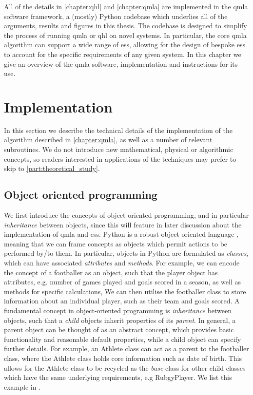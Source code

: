 All of the details in \cref{chapter:qhl} and \cref{chapter:qmla} are implemented in the \gls{qmla}
    software framework, a (mostly) Python codebase which underlies all of the 
    arguments, results and figures in this thesis. 
The codebase is designed to simplify the process of running \gls{qmla} or \gls{qhl}
    on novel systems.
In particular, the core \gls{qmla} algorithm can support a wide range of \glspl{es}, 
    allowing for the design of bespoke \glspl{es} to account for the specific requirements 
    of any given system. 
In this chapter we give an overview of the \gls{qmla} software, 
    implementation and instructions for its use. 

\section{Implementation}
In this section we describe the technical details of the implementation of the 
    algorithm described in \cref{chapter:qmla}, as well as a number of relevant subroutines. 
We do not introduce new mathematical, physical or algorithmic concepts, 
    so readers interested in applications of the techniques may prefer to skip to \cref{part:theoretical_study}.

\subsection{Object oriented programming}
We first introduce the concepts of object-oriented programming, 
    and in particular \emph{inheritance} between objects, 
    since this will feature in later discussion about the implementation of \gls{qmla}
    and \glspl{es}. 
Python is a robust object-oriented language \cite{python-manual}, meaning that we can frame 
    concepts as objects which permit actions to be performed by/to them. 
In particular, objects in Python are formulated as \emph{classes}, 
    which can have associated \emph{attributes} and \emph{methods}. 
For example, we can encode the concept of a footballer as an object,
    such that the player object has attributes, e.g. number of games played and goals scored in a season, 
    as well as methods for specific calculations, 
We can then utilise the footballer class to store information about an individual player, 
    such as their team and goals scored. 
A fundamental concept in object-oriented programming is \emph{inheritance} between objects, 
    such that a \emph{child} objects inherit properties of its \emph{parent}.
In general, a parent object can be thought of as an abstract concept, 
    which provides basic functionality and reasonable default properties,
    while a child object can specify further details. 
For example, an Athlete class can act as a parent to the footballer class, 
    where the Athlete class holds core information such as date of birth. 
This allows for the Athlete class to be recycled as the \emph{base} class for other child classes
    which have the same underlying requirements, e.g RubgyPlayer. 
We list this example in . 

